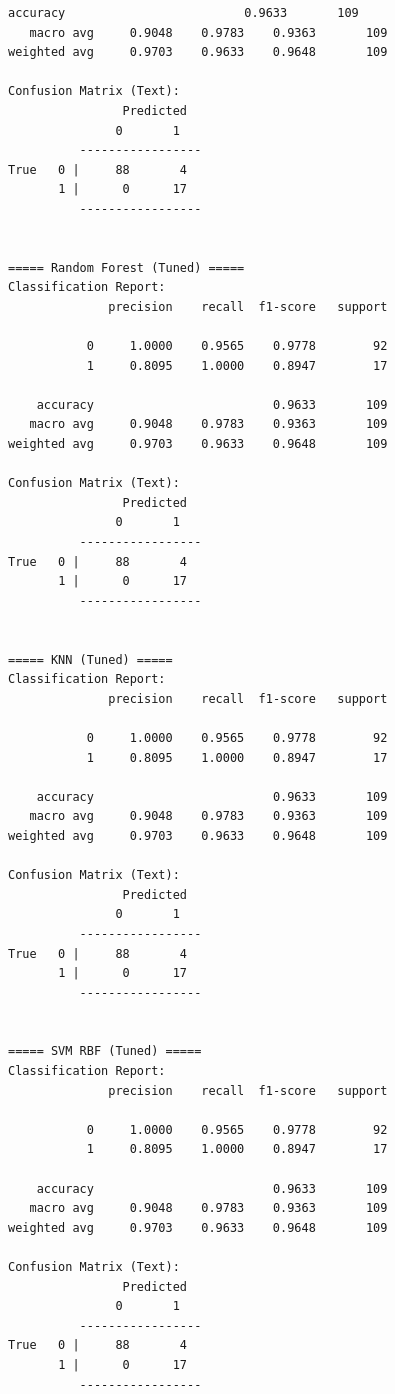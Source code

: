 \begin{lstlisting}[caption={Output 21}]
    accuracy                         0.9633       109
   macro avg     0.9048    0.9783    0.9363       109
weighted avg     0.9703    0.9633    0.9648       109

Confusion Matrix (Text):
                Predicted
               0       1
          -----------------
True   0 |     88       4
       1 |      0      17
          -----------------


===== Random Forest (Tuned) =====
Classification Report:
              precision    recall  f1-score   support

           0     1.0000    0.9565    0.9778        92
           1     0.8095    1.0000    0.8947        17

    accuracy                         0.9633       109
   macro avg     0.9048    0.9783    0.9363       109
weighted avg     0.9703    0.9633    0.9648       109

Confusion Matrix (Text):
                Predicted
               0       1
          -----------------
True   0 |     88       4
       1 |      0      17
          -----------------


===== KNN (Tuned) =====
Classification Report:
              precision    recall  f1-score   support

           0     1.0000    0.9565    0.9778        92
           1     0.8095    1.0000    0.8947        17

    accuracy                         0.9633       109
   macro avg     0.9048    0.9783    0.9363       109
weighted avg     0.9703    0.9633    0.9648       109

Confusion Matrix (Text):
                Predicted
               0       1
          -----------------
True   0 |     88       4
       1 |      0      17
          -----------------


===== SVM RBF (Tuned) =====
Classification Report:
              precision    recall  f1-score   support

           0     1.0000    0.9565    0.9778        92
           1     0.8095    1.0000    0.8947        17

    accuracy                         0.9633       109
   macro avg     0.9048    0.9783    0.9363       109
weighted avg     0.9703    0.9633    0.9648       109

Confusion Matrix (Text):
                Predicted
               0       1
          -----------------
True   0 |     88       4
       1 |      0      17
          -----------------



\end{lstlisting}
